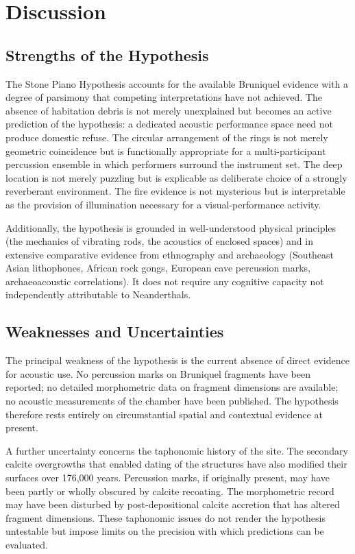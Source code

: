 \documentclass[12pt]{article}
\begin{document}
\section{Discussion}


\subsection{Strengths of the Hypothesis}

The Stone Piano Hypothesis accounts for the available Bruniquel evidence with a degree of parsimony that competing interpretations have not achieved. The absence of habitation debris is not merely unexplained but becomes an active prediction of the hypothesis: a dedicated acoustic performance space need not produce domestic refuse. The circular arrangement of the rings is not merely geometric coincidence but is functionally appropriate for a multi-participant percussion ensemble in which performers surround the instrument set. The deep location is not merely puzzling but is explicable as deliberate choice of a strongly reverberant environment. The fire evidence is not mysterious but is interpretable as the provision of illumination necessary for a visual-performance activity.

Additionally, the hypothesis is grounded in well-understood physical principles (the mechanics of vibrating rods, the acoustics of enclosed spaces) and in extensive comparative evidence from ethnography and archaeology (Southeast Asian lithophones, African rock gongs, European cave percussion marks, archaeoacoustic correlations). It does not require any cognitive capacity not independently attributable to Neanderthals.

\subsection{Weaknesses and Uncertainties}

The principal weakness of the hypothesis is the current absence of direct evidence for acoustic use. No percussion marks on Bruniquel fragments have been reported; no detailed morphometric data on fragment dimensions are available; no acoustic measurements of the chamber have been published. The hypothesis therefore rests entirely on circumstantial spatial and contextual evidence at present.

A further uncertainty concerns the taphonomic history of the site. The secondary calcite overgrowths that enabled dating of the structures have also modified their surfaces over 176,000 years. Percussion marks, if originally present, may have been partly or wholly obscured by calcite recoating. The morphometric record may have been disturbed by post-depositional calcite accretion that has altered fragment dimensions. These taphonomic issues do not render the hypothesis untestable but impose limits on the precision with which predictions can be evaluated.
\end{document}
